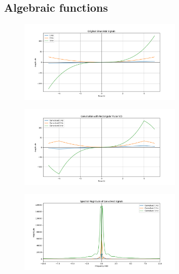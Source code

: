 \documentclass[a4paper,12pt]{article}
\begin{document}
\subsection * {Algebraic functions}
\begin{figure}[H]
    \centering
    \includegraphics[width=0.7\textwidth]{figs/alg1.png}
\end{figure}
\begin{figure}[H]
    \centering
    \includegraphics[width=0.7\textwidth]{figs/alg2.png}
\end{figure}
\begin{figure}[H]
    \centering
    \includegraphics[width=0.7\textwidth]{figs/alg3.png}
\end{figure}
\end{document}
